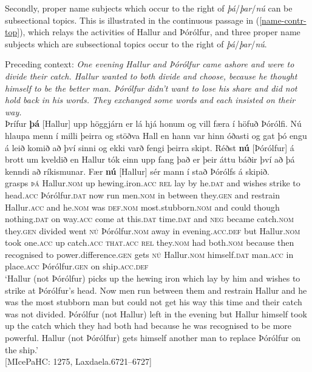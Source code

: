 \documentclass[output=paper,colorlinks,citecolor=brown]{langscibook}
\begin{document}
Secondly, proper name subjects which occur to the right of \textit{þá}/\textit{þar}/\textit{nú} can be subsectional topics.
This is illustrated in the continuous passage in (\ref{name-contr-top}), which relays the activities of Hallur and Þórólfur, and three proper name subjects which are subsectional topics occur to the right of \textit{þá}/\textit{þar}/\textit{nú}.

\ea \label{name-contr-top}  
Preceding context: \textit{One evening Hallur and Þórólfur came ashore and were to divide their catch. Hallur wanted to both divide and choose, because he thought himself to be the better man. Þórólfur didn't want to lose his share and did not hold back in his words. They exchanged some words and each insisted on their way.}\\
    \gll Þrífur \textbf{þá} [Hallur] upp höggjárn er lá hjá honum og vill færa í höfuð Þórólfi. Nú hlaupa menn í milli þeirra og stöðva Hall en hann var hinn óðasti og gat þó engu á leið komið að því sinni og ekki varð fengi þeirra skipt. Réðst \textbf{nú} [Þórólfur] {á brott} um kveldið en Hallur tók einn upp fang það er þeir áttu báðir {því að} þá kenndi að ríkismunar. Fær \textbf{nú} [Hallur] sér mann í stað Þórólfs á skipið.\\
    grasps \textsc{þá} Hallur.\textsc{nom} up hewing.iron.\textsc{acc} \textsc{rel} lay by he.\textsc{dat} and wishes strike to head.\textsc{acc} Þórólfur.\textsc{dat} now run men.\textsc{nom} in between they.\textsc{gen} and restrain Hallur.\textsc{acc} and he.\textsc{nom} was \textsc{def.nom} most.stubborn.\textsc{nom} and could though nothing.\textsc{dat} on way.\textsc{acc} come at this.\textsc{dat} time.\textsc{dat} and \textsc{neg} became catch.\textsc{nom} they.\textsc{gen} divided went \textsc{nú} Þórólfur.\textsc{nom} away in evening.\textsc{acc.def} but Hallur.\textsc{nom} took one.\textsc{acc} up catch.\textsc{acc} \textsc{that.acc} \textsc{rel} they.\textsc{nom} had both.\textsc{nom} because then recognised to power.difference.\textsc{gen} gets \textsc{nú} Hallur.\textsc{nom} himself.\textsc{dat} man.\textsc{acc} in place.\textsc{acc} Þórólfur.\textsc{gen} on ship.\textsc{acc.def}\\
    \glt `Hallur (not Þórólfur) picks up the hewing iron which lay by him and wishes to strike at Þórólfur's head. Now men run between them and restrain Hallur and he was the most stubborn man but could not get his way this time and their catch was not divided. Þórólfur (not Hallur) left in the evening but Hallur himself took up the catch which they had both had because he was recognised to be more powerful. Hallur (not Þórólfur) gets himself another man to replace Þórólfur on the ship.' \\ \hfill [MIcePaHC: 1275, Laxdaela.6721--6727]
\z 
\end{document}
